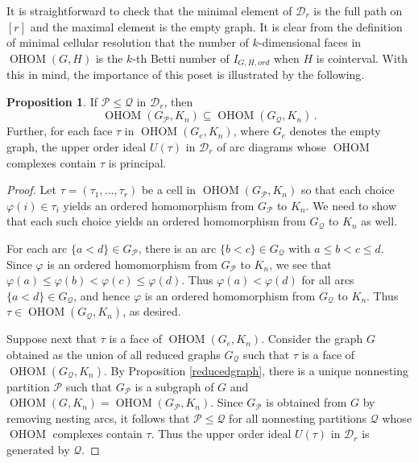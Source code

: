 \documentclass[11pt]{amsart}
\theoremstyle{definition}
\newtheorem{proposition}[theorem]{Proposition}
\numberwithin{equation}{section}
\theoremstyle{remark}
\numberwithin{equation}{section}
\begin{document}
It is straightforward to check that the minimal element of ${\mathcal{D}}_r$ is the full path on $[r]$ and the maximal element is the empty graph.
It is clear from the definition of minimal cellular resolution that the number of $k$-dimensional faces in $\operatorname{OHOM}(G,H)$ is the $k$-th Betti number of $I_{G,H,ord}$ when $H$ is cointerval.
With this in mind, the importance of this poset is illustrated by the following.

\begin{proposition}
If ${\mathcal{P}}\leq {\mathcal{Q}}$ in ${\mathcal{D}}_r$, then 
\[\operatorname{OHOM}(G_{\mathcal{P}},K_n)\subseteq\operatorname{OHOM}(G_{\mathcal{Q}},K_n) \, .\]
Further, for each face $\tau$ in $\operatorname{OHOM}(G_{e},K_n)$, where $G_e$ denotes the empty graph, the upper order ideal $U(\tau)$ in ${\mathcal{D}}_r$ of arc diagrams whose $\operatorname{OHOM}$ complexes contain $\tau$ is principal.
\end{proposition}

\begin{proof}
Let $\tau = (\tau_1,\ldots,\tau_r)$ be a cell in $\operatorname{OHOM}(G_{\mathcal{P}},K_n)$ so that each choice $\varphi(i) \in \tau_i$ yields an ordered homomorphism from $G_{\mathcal{P}}$ to $K_n$. 
We need to show that each such choice yields an ordered homomorphism from $G_{\mathcal{Q}}$ to $K_n$ as well.

For each arc $\{a<d\} \in G_{\mathcal{P}}$, there is an arc $\{b<c\} \in G_{\mathcal{Q}}$ with $a \leq b < c \leq d$.  
Since $\varphi$ is an ordered homomorphism from $G_{\mathcal{P}}$ to $K_n$, we see that $\varphi(a) \leq \varphi(b) < \varphi(c) \leq \varphi(d)$.  
Thus $\varphi(a) < \varphi(d)$ for all arcs $\{a<d\} \in G_{\mathcal{Q}}$, and hence $\varphi$ is an ordered homomorphism from $G_{\mathcal{Q}}$ to $K_n$.  
Thus $\tau \in \operatorname{OHOM}(G_{\mathcal{Q}},K_n)$, as desired.

Suppose next that $\tau$ is a face of $\operatorname{OHOM}(G_e,K_n)$.  
Consider the graph $G$ obtained as the union of all reduced graphs $G_{\mathcal{Q}}$ such that $\tau$ is a face of $\operatorname{OHOM}(G_{\mathcal{Q}},K_n)$.  
By Proposition \ref{reducedgraph}, there is a unique nonnesting partition ${\mathcal{P}}$ such that $G_{\mathcal{P}}$ is a subgraph of $G$ and $\operatorname{OHOM}(G,K_n) = \operatorname{OHOM}(G_{\mathcal{P}},K_n)$.  
Since $G_{\mathcal{P}}$ is obtained from $G$ by removing nesting arcs, it follows that ${\mathcal{P}} \leq {\mathcal{Q}}$ for all nonnesting partitions ${\mathcal{Q}}$ whose $\operatorname{OHOM}$ complexes contain $\tau$.  
Thus the upper order ideal $U(\tau)$ in ${\mathcal{D}}_r$ is generated by ${\mathcal{Q}}$.
\end{proof}
\end{document}
